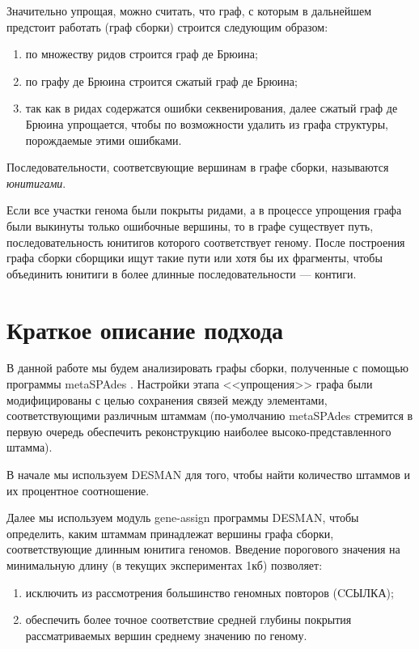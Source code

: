 \documentclass{spbau-diploma}
\begin{document}
Значительно упрощая, можно считать, что граф, с которым в дальнейшем предстоит работать (граф сборки) строится 
следующим образом:
\begin{enumerate}
    \item по множеству ридов строится граф де Брюина;
    \item по графу де Брюина строится сжатый граф де Брюина;
    \item так как в ридах содержатся ошибки секвенирования, далее сжатый граф де Брюина упрощается, чтобы по возможности удалить из графа структуры, порождаемые этими ошибками.
\end{enumerate}
Последовательности, соответсвующие вершинам в графе сборки, называются \textit{юнитигами}.

Если все участки генома были покрыты ридами, а в процессе упрощения графа были выкинуты только ошибочные вершины, то в графе существует путь, последовательность юнитигов которого соответствует геному. После построения графа сборки сборщики ищут такие пути или хотя бы их фрагменты, чтобы объединить юнитиги в более длинные последовательности --- контиги.




\section{Краткое описание подхода}

В данной работе мы будем анализировать графы сборки, полученные с помощью программы metaSPAdes \cite{MetaSpades}. Настройки этапа <<упрощения>> графа были модифицированы с целью сохранения связей между элементами, соответствующими различным штаммам (по-умолчанию metaSPAdes стремится в первую очередь обеспечить реконструкцию наиболее высоко-представленного штамма). 

В начале мы используем DESMAN для того, чтобы найти количество штаммов и их процентное соотношение. 

Далее мы используем модуль gene-assign программы DESMAN, чтобы определить, каким штаммам принадлежат вершины графа сборки, соответствующие длинным юнитига геномов. Введение порогового значения на минимальную длину (в текущих экспериментах 1кб) позволяет: 
\begin{enumerate}
    \item исключить из рассмотрения большинство геномных повторов (CСЫЛКА);
    \item обеспечить более точное соответствие средней глубины покрытия рассматриваемых вершин среднему значению по геному.
\end{enumerate}
 
\end{document}
